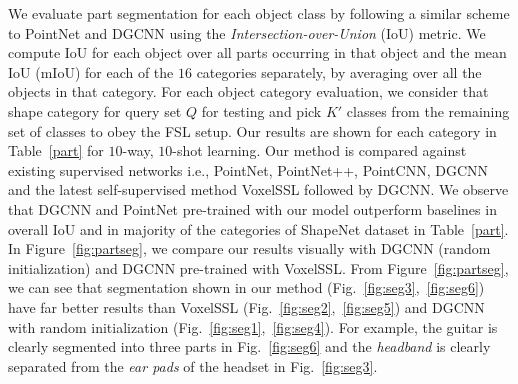 \documentclass{article}
\begin{document}
We evaluate part segmentation for each object class by following a similar scheme to PointNet and DGCNN using the \emph{Intersection-over-Union} (IoU) metric. We compute IoU for each object over all parts occurring in that object and the mean IoU (mIoU) for each of the $16$ categories separately, by averaging over all the objects in that category. For each object category evaluation, we consider that shape category for query set $Q$ for testing and pick $K'$ classes from the remaining set of classes to obey the FSL setup. Our results are shown for each category in Table~\ref{part} for $10$-way, $10$-shot learning. Our method is compared against existing supervised networks i.e., PointNet, PointNet++, PointCNN, DGCNN and the latest self-supervised method VoxelSSL followed by DGCNN. We observe that DGCNN and PointNet pre-trained with our model outperform baselines in overall IoU and in majority of the categories of ShapeNet dataset in Table~\ref{part}. In Figure~\ref{fig:partseg}, we compare our results visually with DGCNN (random initialization) and DGCNN pre-trained with VoxelSSL. From Figure~\ref{fig:partseg}, we can see that segmentation shown in our method (Fig.~\ref{fig:seg3},~\ref{fig:seg6}) have far better results than VoxelSSL (Fig.~\ref{fig:seg2},~\ref{fig:seg5}) and DGCNN with random initialization (Fig.~\ref{fig:seg1},~\ref{fig:seg4}). For example, the guitar is clearly segmented into three parts in Fig.~\ref{fig:seg6} and the \emph{headband} is clearly separated from the \emph{ear pads} of the headset in Fig.~\ref{fig:seg3}. 
\end{document}
